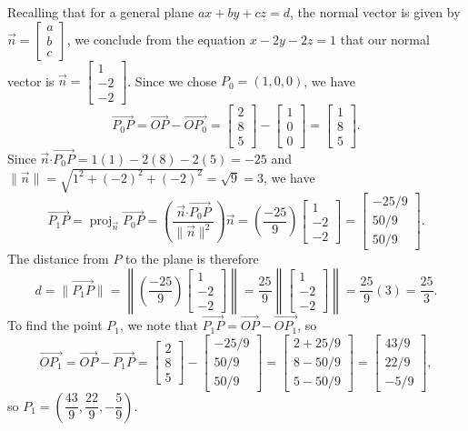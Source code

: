 \documentclass[12pt]{article}
\newcommand{\len}[1]{\lVert #1\rVert}
\newcommand{\dotp}{\boldsymbol{\cdot}}
\newcommand{\bbm}{\begin{bmatrix}}
\newcommand{\ebm}{\end{bmatrix}}
\DeclareMathOperator{\proj}{proj}
\begin{document}
\begin{enumerate}
Recalling that for a general plane $ax+by+cz=d$, the normal vector is given by $\vec{n} = \bbm a\\b\\c\ebm$, we conclude from the equation $x-2y-2z=1$ that our normal vector is $\vec{n} = \bbm 1\\-2\\-2\ebm$. Since we chose $P_0=(1,0,0)$, we have
\[
 \overrightarrow{P_0P} = \overrightarrow{OP}-\overrightarrow{OP_0} = \bbm 2\\8\\5\ebm - \bbm 1\\0\\0\ebm = \bbm 1\\8\\5\ebm.
\]
Since $\vec{n}\dotp\overrightarrow{P_0P} = 1(1)-2(8)-2(5) = -25$ and $\len{\vec{n}} = \sqrt{1^2+(-2)^2+(-2)^2} = \sqrt{9}=3$, we have
\[
 \overrightarrow{P_1P} = \proj_{\vec{n}}\overrightarrow{P_0P} = \left(\frac{\vec{n}\dotp\overrightarrow{P_0P}}{\len{\vec{n}}^2}\right)\vec{n} = \left(\frac{-25}{9}\right)\bbm 1\\-2\\-2\ebm = \bbm -25/9\\50/9\\50/9\ebm.
\]
The distance from $P$ to the plane is therefore
\[
 d=\len{\overrightarrow{P_1P}} = \left\lVert \left(\frac{-25}{9}\right)\bbm 1\\-2\\-2\ebm\right\rVert = \frac{25}{9}\left\lVert \bbm 1\\-2\\-2\ebm\right\rVert = \frac{25}{9}(3) = \frac{25}{3}.
\]
To find the point $P_1$, we note that $\overrightarrow{P_1P} = \overrightarrow{OP}-\overrightarrow{OP_1}$, so
\[
 \overrightarrow{OP_1} = \overrightarrow{OP}-\overrightarrow{P_1P} = \bbm 2\\8\\5\ebm - \bbm -25/9\\50/9\\50/9\ebm = \bbm 2+25/9\\8-50/9\\5-50/9\ebm = \bbm 43/9\\22/9\\-5/9\ebm,
\]
so $P_1 = \left(\dfrac{43}{9},\dfrac{22}{9},-\dfrac{5}{9}\right)$.

\bigskip


\end{enumerate}
\end{document}
